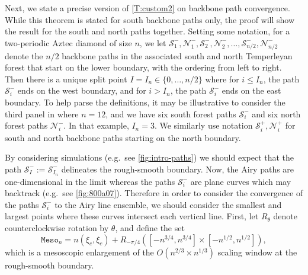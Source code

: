 \documentclass[11pt,twoside]{amsart}
\theoremstyle{plain}
\numberwithin{quest}{section}
\theoremstyle{remark}
\numberwithin{rem}{section}
\theoremstyle{definition}
\newcommand{\cS}{\mathcal{S}}
\newcommand{\cN}{\mathcal{N}}
\renewcommand{\tt}[1]{{\mathtt{#1}}}
\begin{document}
    Next, we state a precise version of \cref{T:custom2} on backbone path convergence. While this theorem is stated for south backbone paths only, the proof will show the result for the south and north paths together. Setting some notation, for a two-periodic Aztec diamond of size $n$, we let $\cS_1^-, \cN_1^-, \cS_2^-, \cN_2^-,  \dots, \cS_{n/2}^-, \cN_{n/2}^-$ denote the $n/2$ backbone paths in the associated south and north Temperleyan forest that start on the lower boundary, with the ordering from left to right.  Then there is a unique split point $I = I_n \in \{0, \dots, n/2\}$ where for $i \le I_n$, the path $\cS_i^-$ ends on the west boundary, and for $i > I_n$, the path $\cS_i^-$ ends on the east boundary. To help parse the definitions, it may be illustrative to consider the third panel in  where $n = 12$, and we have six south forest paths $\cS_i^-$ and six north forest paths $\cN_i^-$. In that example, $I_n = 3$. We similarly use notation $\cS_i^+, \cN_i^+$ for south and north backbone paths starting on the north boundary.
    
    By considering simulations (e.g.\ see \cref{fig:intro-paths}) we should expect that the path $\cS_I^- := \cS_{I_n}^-$ delineates the rough-smooth boundary. 
	Now, the Airy paths are one-dimensional in the limit whereas the paths $\cS_i^-$ are plane curves which may backtrack (e.g.\ see \cref{fig:800a07}). Therefore in order to consider the convergence of the paths $\cS_i^-$ to the Airy line ensemble, we should consider the smallest and largest points where these curves intersect each vertical line. First, let $R_\theta$ denote counterclockwise rotation by $\theta$, and define the set
    $$
    \tt{Meso}_n = n(\xi_c, \xi_c) + R_{-\pi/4} ([-n^{3/4}, n^{3/4}] \times [- n^{1/2}, n^{1/2}]),
    $$
    which is a mesoscopic enlargement of the $O(n^{2/3} \times n^{1/3})$ scaling window at the rough-smooth boundary.
    
\end{document}
